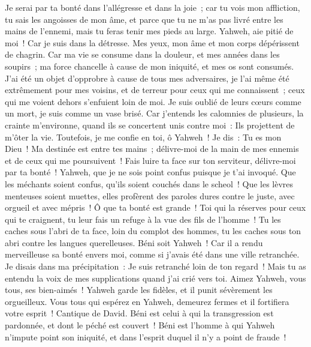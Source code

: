 \begin{multicols}{2}
Je serai par ta bonté dans l'allégresse et dans la joie~; car tu vois mon affliction, tu sais les angoisses de mon âme,
et parce que tu ne m'as pas livré entre les mains de l'ennemi, mais tu feras tenir mes pieds au large.
Yahweh, aie pitié de moi~! Car je suis dans la détresse. Mes yeux, mon âme et mon corps dépérissent de chagrin.
Car ma vie se consume dans la douleur, et mes années dans les soupirs~; ma force chancelle à cause de mon iniquité, et mes os sont consumés.
J'ai été un objet d'opprobre à cause de tous mes adversaires, je l'ai même été extrêmement pour mes voisins, et de terreur pour ceux qui me connaissent~; ceux qui me voient dehors s'enfuient loin de moi.
Je suis oublié de leurs cœurs comme un mort, je suis comme un vase brisé.
Car j'entends les calomnies de plusieurs, la crainte m'environne, quand ils se concertent unis contre moi~: Ils projettent de m'ôter la vie.
Toutefois, je me confie en toi, ô Yahweh~! Je dis~: Tu es mon Dieu~!
Ma destinée est entre tes mains~; délivre-moi de la main de mes ennemis et de ceux qui me poursuivent~!
Fais luire ta face sur ton serviteur, délivre-moi par ta bonté~!
Yahweh, que je ne sois point confus puisque je t'ai invoqué. Que les méchants soient confus, qu'ils soient couchés dans le scheol~!
Que les lèvres menteuses soient muettes, elles profèrent des paroles dures contre le juste, avec orgueil et avec mépris~!
Ô que ta bonté est grande~! Toi qui la réserves pour ceux qui te craignent, tu leur fais un refuge à la vue des fils de l'homme~!
Tu les caches sous l'abri de ta face, loin du complot des hommes, tu les caches sous ton abri contre les langues querelleuses.
Béni soit Yahweh~! Car il a rendu merveilleuse sa bonté envers moi, comme si j'avais été dans une ville retranchée.
Je disais dans ma précipitation~: Je suis retranché loin de ton regard~! Mais tu as entendu la voix de mes supplications quand j'ai crié vers toi.
Aimez Yahweh, vous tous, ses bien-aimés~! Yahweh garde les fidèles, et il punit sévèrement les orgueilleux.
 Vous tous qui espérez en Yahweh, demeurez fermes et il fortifiera votre esprit~!
\VerseOne{}Cantique de David. Béni est celui à qui la transgression est pardonnée, et dont le péché est couvert~!
Béni est l'homme à qui Yahweh n'impute point son iniquité, et dans l'esprit duquel il n'y a point de fraude~!

\end{multicols}
